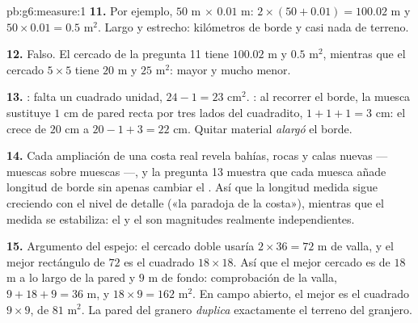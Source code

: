 \begin{solution}{pb:g6:measure:1}
\textbf{11.} Por ejemplo, $50$ m $\times$ $0.01$ m: 
$2 \times (50 + 0.01) = 100.02$ m y 
$50 \times 0.01 = 0.5$ m$^2$. Largo y estrecho: kilómetros de
borde y casi nada de terreno.

\textbf{12.} Falso. El cercado de la pregunta 11 tiene 
$100.02$ m y  $0.5$ m$^2$, mientras que el cercado $5 \times 5$ tiene
 $20$ m y  $25$ m$^2$: mayor  y  mucho
menor.

\textbf{13.} : falta un cuadrado unidad,
$24 - 1 = 23$ cm$^2$. : al recorrer el borde, la muesca
sustituye $1$ cm de pared recta por tres lados del cuadradito,
$1 + 1 + 1 = 3$ cm: el  crece de $20$ cm a
$20 - 1 + 3 = 22$ cm. Quitar material \emph{alargó} el
borde.

\textbf{14.} Cada ampliación de una costa real revela bahías, rocas
y calas nuevas --- muescas sobre muescas ---, y la pregunta 13 muestra que
cada muesca añade longitud de borde sin apenas cambiar el .
Así que la longitud medida sigue creciendo con el nivel de detalle
(«la paradoja de la costa»), mientras que el  medida se
estabiliza: el  y el  son magnitudes realmente independientes.

\textbf{15.} Argumento del espejo: el cercado doble usaría
$2 \times 36 = 72$ m de valla, y el mejor rectángulo de
 $72$ es el cuadrado $18 \times 18$. Así que el mejor cercado es de
$18$ m a lo largo de la pared y $9$ m de fondo: comprobación de la valla,
$9 + 18 + 9 = 36$ m, y  $18 \times 9 = 162$ m$^2$. En campo
abierto, el mejor es el cuadrado $9 \times 9$, de  $81$ m$^2$.
La pared del granero \emph{duplica} exactamente el terreno del granjero.
\end{solution}

